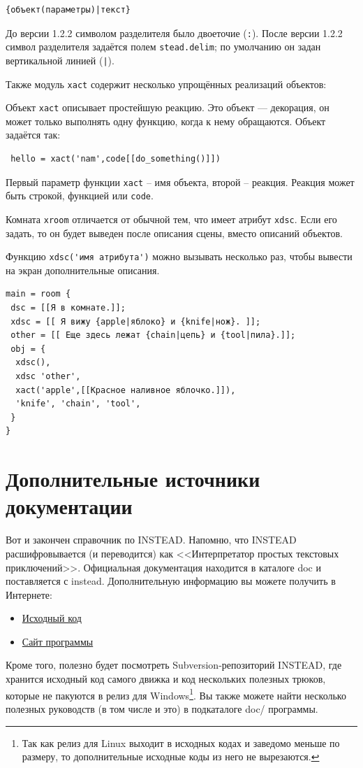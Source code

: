 \documentclass[12pt]{article}
\begin{document}
\begin{verbatim}
{объект(параметры)|текст}
\end{verbatim}

До версии 1.2.2 символом разделителя было двоеточие (\verb/:/). После версии 1.2.2 символ разделителя задаётся полем \verb/stead.delim/; по умолчанию он задан вертикальной линией (\verb/|/).

Также модуль \verb/xact/ содержит несколько упрощённых реализаций объектов:

Объект \verb/xact/ описывает простейшую реакцию. Это объект — декорация, он может только выполнять одну функцию, когда к нему обращаются. Объект задаётся так:

\begin{verbatim}
 hello = xact('nam',code[[do_something()]])
\end{verbatim}

Первый параметр функции \verb/xact/ – имя объекта, второй – реакция. Реакция может быть строкой, функцией или \verb/code/.

Комната \verb/xroom/ отличается от обычной тем, что имеет атрибут \verb/xdsc/. Если его задать, то он будет выведен после описания сцены, вместо описаний объектов.

Функцию \verb/xdsc('имя атрибута')/ можно вызывать несколько раз, чтобы вывести на экран дополнительные описания.

\begin{verbatim}
main = room {
 dsc = [[Я в комнате.]];
 xdsc = [[ Я вижу {apple|яблоко} и {knife|нож}. ]];
 other = [[ Еще здесь лежат {chain|цепь} и {tool|пила}.]];
 obj = {
  xdsc(),
  xdsc 'other',
  xact('apple',[[Красное наливное яблочко.]]),
  'knife', 'chain', 'tool',
 }
}
\end{verbatim}

\section{Дополнительные источники документации}
Вот и закончен справочник по INSTEAD. Напомню, что INSTEAD расшифровывается (и переводится) как <<Интерпретатор простых текстовых приключений>>. Официальная документация находится в каталоге doc и поставляется с instead. Дополнительную информацию вы можете получить в Интернете:

\begin{itemize}
\item \href{http://instead.googlecode.com/}{Исходный код}
\item \href{http://instead.syscall.ru/}{Сайт программы}
\end{itemize}

Кроме того, полезно будет посмотреть Subversion-репозиторий INSTEAD, где хранится исходный код самого движка и код нескольких полезных трюков, которые не пакуются в релиз для Windows\footnote{Так как релиз для Linux выходит в исходных кодах и заведомо меньше по размеру, то дополнительные исходные коды из него не вырезаются.}. Вы также можете найти несколько полезных руководств (в том числе и это) в подкаталоге doc/ программы.

\printindex
\end{document}
